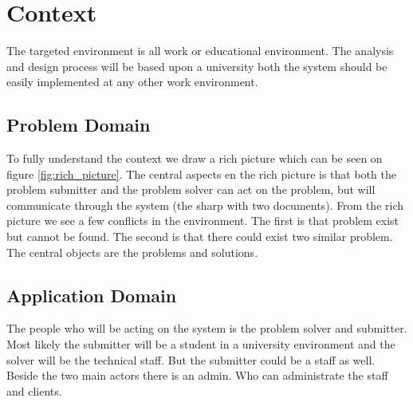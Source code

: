 \section{Context}
The targeted environment is all work or educational environment. The analysis and design process will be based upon a university both the system should be easily implemented at any other work environment. 

\subsection{Problem Domain}
To fully understand the context we draw a rich picture which can be seen on figure \ref{fig:rich_picture}. 
The central aspects en the rich picture is that both the problem submitter and the problem solver can act on the problem, but will communicate through the system (the sharp with two documents). 
From the rich picture we see a few conflicts in the environment. 
The first is that problem exist but cannot be found. The second is that there could exist two similar problem. The central objects are the problems and solutions. 

\subsection{Application Domain}
The people who will be acting on the system is the problem solver and submitter. Most likely the submitter will be a student in a university environment and the solver will be the technical staff. But the submitter could be a staff as well. Beside the two main actors there is an admin. Who can administrate the staff and clients. 